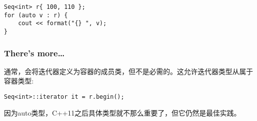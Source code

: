 \begin{lstlisting}[style=styleCXX]
Seq<int> r{ 100, 110 };
for (auto v : r) {
	cout << format("{} ", v);
}
\end{lstlisting}

\subsubsection{There's more…}

通常，会将迭代器定义为容器的成员类，但不是必需的。这允许迭代器类型从属于容器类型:

\begin{lstlisting}[style=styleCXX]
Seq<int>::iterator it = r.begin();
\end{lstlisting}

因为auto类型，C++11之后具体类型就不那么重要了，但它仍然是最佳实践。





